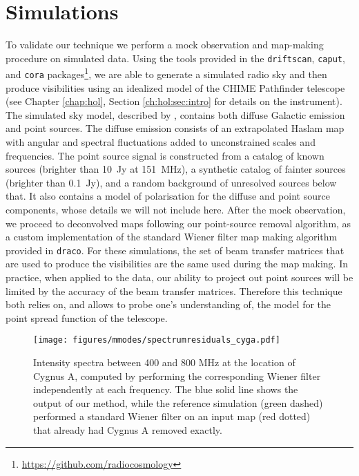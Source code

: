 \section{Simulations}
\label{ch:mm:sec:sims}

To validate our technique we perform a mock observation and map-making procedure on simulated data. Using the tools provided in the \texttt{driftscan}, \texttt{caput}, and \texttt{cora} packages\footnote{\url{https://github.com/radiocosmology}}, we are able to generate a simulated radio sky and then produce visibilities using an idealized model of the CHIME Pathfinder telescope \citep{chimepath1} (see Chapter \ref{chap:hol}, Section \ref{ch:hol:sec:intro} for details on the instrument). The simulated sky model, described by \cite{mmodes2}, contains both diffuse Galactic emission and point sources. The diffuse emission consists of an extrapolated Haslam map \citep{haslam1981, haslam1982} with angular and spectral fluctuations added to unconstrained scales and frequencies. The point source signal is constructed from a catalog of known sources (brighter than 10~Jy at 151~MHz), a synthetic catalog of fainter sources (brighter than 0.1~Jy), and a random background of unresolved sources below that. It also contains a model of polarisation for the diffuse and point source components, whose details we will not include here. After the mock observation, we proceed to deconvolved maps following our point-source removal algorithm, as a custom implementation of the standard Wiener filter map making algorithm provided in \texttt{draco}. For these simulations, the set of beam transfer matrices that are used to produce the visibilities are the same used during the map making. In practice, when applied to the data, our ability to project out point sources will be limited by the accuracy of the beam transfer matrices. Therefore this technique both relies on, and allows to probe one's understanding of, the model for the point spread function of the telescope.

\begin{figure}
\centering
\texttt{[image: figures/mmodes/spectrumresiduals\_cyga.pdf]}
\caption{Intensity spectra between 400 and 800 MHz at the location of Cygnus A, computed by performing the corresponding Wiener filter independently at each frequency. The blue solid line shows the output of our method, while the reference simulation (green dashed) performed a standard Wiener filter on an input map (red dotted) that already had Cygnus A removed exactly.}
\label{residuals}
\end{figure}

